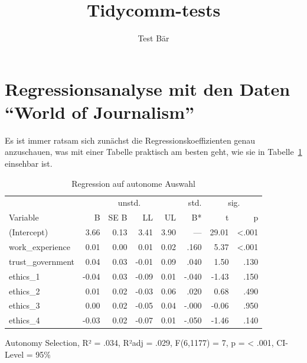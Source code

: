 \documentclass[
  a4paper,
  DIV=11,
  numbers=noendperiod]{scrartcl}
\title{Tidycomm-tests}
\author{Test Bär}
\date{}
\renewcommand*\contentsname{Inhaltsverzeichnis}
\newcommand\contentsname{Inhaltsverzeichnis}
\begin{document}
\maketitle

\renewcommand*\contentsname{Inhaltsverzeichnis}
{
\hypersetup{linkcolor=}
\setcounter{tocdepth}{3}
\tableofcontents
}

\section{Regressionsanalyse mit den Daten ``World of
Journalism''}\label{regressionsanalyse-mit-den-daten-world-of-journalism}

Es ist immer ratsam sich zunächst die Regressionskoeffizienten genau
anzuschauen, was mit einer Tabelle praktisch am besten geht, wie sie in
Tabelle~\ref{tbl-tab1} einsehbar ist.

\begingroup
\setlength{}
\setlength{}\fontsize{12.0pt}{14.4pt}\selectfont
\setlength{\LTpost}{0mm}

\begin{longtable}{@{\extracolsep{\fill}}lrrrrrrr}

\caption{\label{tbl-tab1}Regression auf autonome Auswahl}

\tabularnewline

\toprule
 & \multicolumn{4}{c}{unstd.} & std. & \multicolumn{2}{c}{sig.} \\ 
\cmidrule(lr){2-5} \cmidrule(lr){6-6} \cmidrule(lr){7-8}
Variable & B & SE B & LL & UL & B* & t & p \\ 
\midrule\addlinespace[2.5pt]
(Intercept) & 3.66 & 0.13 & 3.41 & 3.90 & — & 29.01 & <.001 \\ 
work\_experience & 0.01 & 0.00 & 0.01 & 0.02 & .160 & 5.37 & <.001 \\ 
trust\_government & 0.04 & 0.03 & -0.01 & 0.09 & .040 & 1.50 & .130 \\ 
ethics\_1 & -0.04 & 0.03 & -0.09 & 0.01 & -.040 & -1.43 & .150 \\ 
ethics\_2 & 0.01 & 0.02 & -0.03 & 0.06 & .020 & 0.68 & .490 \\ 
ethics\_3 & 0.00 & 0.02 & -0.05 & 0.04 & -.000 & -0.06 & .950 \\ 
ethics\_4 & -0.03 & 0.02 & -0.07 & 0.01 & -.050 & -1.46 & .140 \\ 
\bottomrule

\end{longtable}

\begin{minipage}{\linewidth}
Autonomy Selection, R² = .034, R²adj = .029, F(6,1177) = 7, p = < .001, CI-Level = 95\%\\
\end{minipage}
\endgroup
\end{document}
